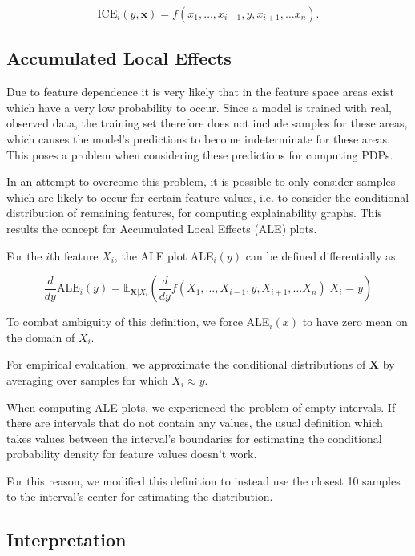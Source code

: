 \documentclass[sigconf,nonacm]{acmart}
\begin{document}
\begin{equation}
\text{ICE}_i(y, \boldsymbol x) = f(x_1,\ldots,x_{i-1},y,x_{i+1},\ldots x_n).
\end{equation}

\subsection{Accumulated Local Effects}
Due to feature dependence it is very likely that in the feature space areas exist which have a very low probability to occur. Since a model is trained with real, observed data, the training set therefore does not include samples for these areas, which causes the model's predictions to become indeterminate for these areas. This poses a problem when considering these predictions for computing PDPs. 

In an attempt to overcome this problem, it is possible to only consider samples which are likely to occur for certain feature values, i.e. to consider the conditional distribution of remaining features, for computing explainability graphs. This results the concept for Accumulated Local Effects (ALE) plots. 

For the $i$th feature $X_i$, the ALE plot ALE$_i(y)$ can be defined differentially as



\begin{equation}
\frac{d}{dy} \text{ALE}_i (y) = \mathbb E_{\boldsymbol X | X_i}\left(\frac{d}{dy} f(X_1,\ldots,X_{i-1},y,X_{i+1},\ldots X_n) | X_i=y\right)
\end{equation}

To combat ambiguity of this definition, we force ALE$_i(x)$ to have zero mean on the domain of $X_i$.

For empirical evaluation, we approximate the conditional distributions of $\boldsymbol X$ by averaging over samples for which $X_i \approx y$. 

When computing ALE plots, we experienced the problem of empty intervals. If there are intervals  that do not contain any values, the usual definition which takes values between the interval's boundaries for estimating the conditional probability density for feature values doesn't work. 

For this reason, we modified this definition to instead use the closest 10 samples to the interval's center for estimating the distribution.

\subsection{Interpretation}
\end{document}
